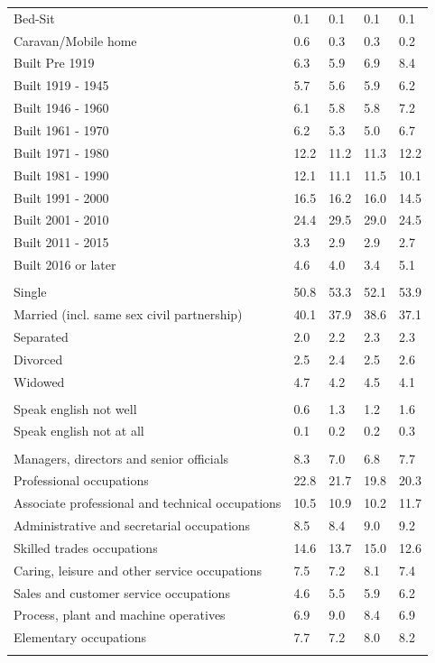 \documentclass{article}
\begin{document}
\begin{table}[h]
\begin{tabular}{KTTTT}
Bed-Sit & 0.1& 0.1& 0.1& 0.1\\
Caravan/Mobile home & 0.6& 0.3& 0.3& 0.2\\
    \hline
Built Pre 1919 & 6.3& 5.9& 6.9& 8.4\\
Built 1919 - 1945 & 5.7& 5.6& 5.9& 6.2\\
Built  1946 - 1960 & 6.1& 5.8& 5.8& 7.2\\
Built  1961 - 1970 & 6.2& 5.3& 5.0& 6.7\\
Built  1971 - 1980 & 12.2& 11.2& 11.3& 12.2\\
Built  1981 - 1990 & 12.1& 11.1& 11.5& 10.1\\
Built  1991 - 2000 & 16.5& 16.2& 16.0& 14.5\\
Built  2001 - 2010 & 24.4& 29.5& 29.0& 24.5\\
Built  2011 - 2015 & 3.3& 2.9& 2.9& 2.7\\
Built  2016 or later & 4.6& 4.0& 3.4& 5.1\\
\hline
    \\
    \hline
Single & 50.8& 53.3& 52.1& 53.9\\
Married (incl. same sex civil partnership) & 40.1& 37.9& 38.6& 37.1\\
Separated  & 2.0& 2.2& 2.3& 2.3\\
Divorced  & 2.5& 2.4& 2.5& 2.6\\
Widowed & 4.7& 4.2& 4.5& 4.1\\
\hline
    \\ 
    \hline
Speak english not well & 0.6& 1.3& 1.2& 1.6\\
Speak english not at all & 0.1& 0.2& 0.2& 0.3\\
\hline
    \\
    \hline
Managers, directors and senior officials & 8.3& 7.0& 6.8& 7.7\\
Professional occupations & 22.8& 21.7& 19.8& 20.3\\
Associate professional and technical occupations & 10.5& 10.9& 10.2& 11.7\\
Administrative and secretarial occupations & 8.5& 8.4& 9.0& 9.2\\
Skilled trades occupations & 14.6& 13.7& 15.0& 12.6\\
Caring, leisure and other service occupations & 7.5& 7.2& 8.1& 7.4\\
Sales and customer service occupations & 4.6& 5.5& 5.9& 6.2\\
Process, plant and machine operatives & 6.9& 9.0& 8.4& 6.9\\
Elementary occupations & 7.7& 7.2& 8.0& 8.2\\
\hline
\end{tabular}
\end{table}
\end{document}
